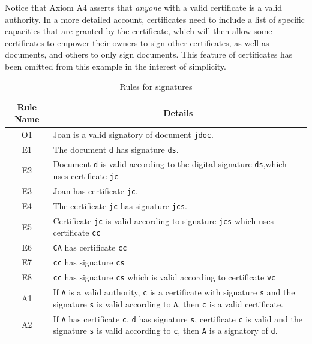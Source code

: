 Notice that Axiom A4 asserts that {\em anyone} with a valid certificate is a valid authority. 
In a more detailed account, certificates need to include a list of specific capacities that are
granted by the certificate, which will then allow some certificates to empower their owners to
sign other certificates, as well as documents, and others to only sign documents. This feature of
certificates has been omitted from this example in the interest of simplicity.

\begin{table}[tb]
		\caption{Rules for signatures}\label{Authorship}
	\begin{center}
			\begin{tabular}{|c|p{9cm}|}
			\hline
			\bf Rule Name&\multicolumn{1}{|c|}{\bf Details} \\
			\hline
O1& Joan is a valid signatory of document {\tt jdoc}.\\
E1& The document {\tt d} has signature {\tt ds}.\\
E2 & Document {\tt d} is valid according to the digital signature {\tt ds},which uses certificate {\tt jc}\\
E3& Joan has certificate {\tt jc}.\\
E4& The certificate {\tt jc} has signature {\tt jcs}.\\
E5& Certificate {\tt jc} is valid according to signature {\tt jcs} which uses certificate {\tt cc} \\ %
					E6& {\tt CA} has certificate {\tt cc} \\ %
					E7& {\tt cc} has signature {\tt cs} \\ %
					E8& {\tt cc} has signature {\tt cs} which is valid according to certificate {\tt vc}\\ %
					A1& If {\tt A} is a valid authority, {\tt c} is a certificate with signature {\tt s} and the signature {\tt s} is
					valid according to {\tt A}, then {\tt c} is a valid certificate.\\
					A2& If {\tt A} has certificate {\tt c}, {\tt d} has signature {\tt s}, certificate {\tt c} is valid and the signature {\tt s} is
					valid according to {\tt c}, then {\tt A} is a signatory of {\tt d}.\\

\end{tabular}
\end{center}
\end{table}
